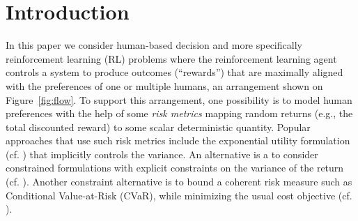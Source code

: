 \documentclass[11pt,letterpaper,english]{article}
\begin{document}



\section{Introduction}
\label{sec:introduction}

In this paper we consider human-based decision and more specifically reinforcement learning (RL) problems 
where the  reinforcement learning agent controls a system 
to produce outcomes (``rewards'') that are maximally aligned with the preferences of 
one or multiple humans, an arrangement shown on Figure~\ref{fig:flow}.
To support this arrangement, one possibility is to model human preferences 
with the help of some \emph{risk metrics} mapping random returns 
(e.g., the total discounted reward) to some scalar deterministic quantity.
Popular approaches that use such risk metrics include the exponential utility formulation 
(cf. \cite{borkar2010learning}) that implicitly controls the variance.
An alternative is a to consider constrained formulations 
with explicit constraints on the variance of the return (cf. \cite{tamar2012policy,Prashanth13AC}). 
Another constraint alternative is to bound a coherent risk measure such as Conditional Value-at-Risk (CVaR), 
while minimizing the usual cost objective (cf. \cite{borkar2010risk,prashanth2014policy}).  
\end{document}

